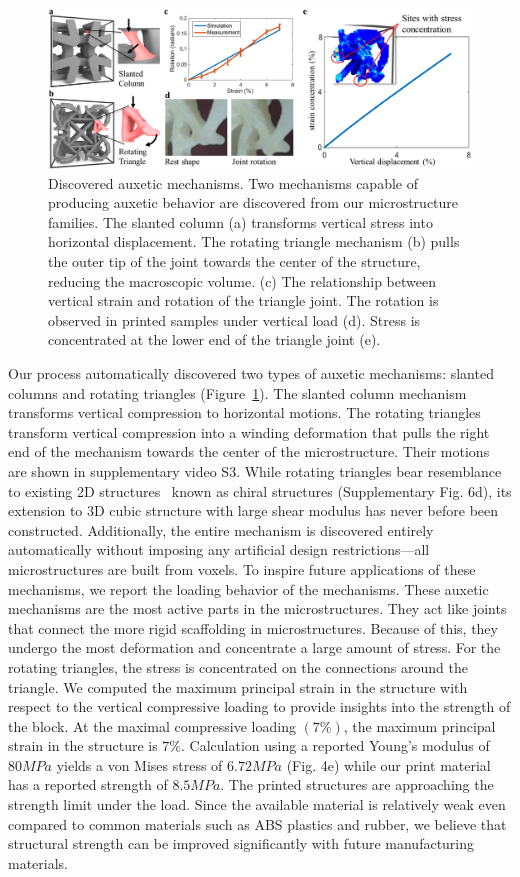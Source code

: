 \begin{figure}
	\includegraphics[width=\columnwidth]{images/auxeticMech.png}
	\caption{Discovered auxetic mechanisms. Two mechanisms capable of producing auxetic behavior are discovered from our microstructure families. The slanted column (a) transforms vertical stress into horizontal displacement. The rotating triangle mechanism (b) pulls the outer tip of the joint towards the center of the structure, reducing the macroscopic volume. (c) The relationship between vertical strain and rotation of the triangle joint. The rotation is observed in printed samples under vertical load (d). Stress is concentrated at the lower end of the triangle joint (e).}
	\label{fig:auxeticMech}
\end{figure}
Our process automatically discovered two types of auxetic mechanisms: slanted columns and rotating triangles (Figure~\ref{fig:auxeticMech}). The slanted column mechanism transforms vertical compression to horizontal motions. The rotating triangles transform vertical compression into a winding deformation that pulls the right end of the mechanism towards the center of the microstructure.
Their motions are shown in supplementary video S3.
While rotating triangles bear resemblance to existing 2D structures~\citep{alderson2010elastic} known as chiral structures (Supplementary Fig. 6d), its extension to 3D cubic structure with large shear modulus has never before been constructed. Additionally, the entire mechanism is discovered entirely automatically without imposing any artificial design restrictions---all microstructures are built from voxels. To inspire future applications of these mechanisms, we report the loading behavior of the mechanisms. These auxetic mechanisms are the most active parts in the microstructures. They act like joints that connect the more rigid scaffolding in microstructures. Because of this, they undergo the most deformation and concentrate a large amount of stress. For the rotating triangles, the stress is concentrated on the connections around the triangle. We computed the maximum principal strain in the structure with respect to the vertical compressive loading to provide insights into the strength of the block.
At the maximal compressive loading $(7\%)$, the maximum principal strain in the structure is $7\%$. Calculation using a reported Young's modulus of $80MPa$ yields a von Mises stress of $6.72MPa$ (Fig. 4e) while our print material has a reported strength of $8.5MPa$. The printed structures are approaching the strength limit under the load. Since the available material is relatively weak even compared to common materials such as ABS plastics and rubber, we believe that structural strength can be improved significantly with future manufacturing materials.

